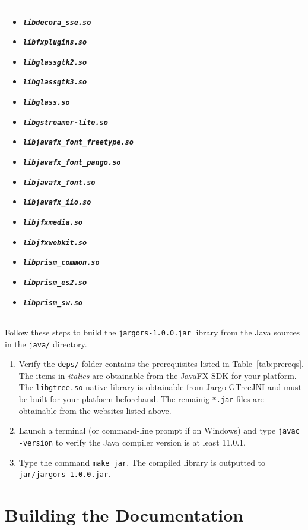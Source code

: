 \begin{table}
\begin{tabular}{|p{}|}
\begin{itemize}
\item \textit{\texttt{libdecora\_sse.so}}
\item \textit{\texttt{libfxplugins.so}}
\item \textit{\texttt{libglassgtk2.so}}
\item \textit{\texttt{libglassgtk3.so}}
\item \textit{\texttt{libglass.so}}
\item \textit{\texttt{libgstreamer-lite.so}}
\item \textit{\texttt{libjavafx\_font\_freetype.so}}
\item \textit{\texttt{libjavafx\_font\_pango.so}}
\item \textit{\texttt{libjavafx\_font.so}}
\item \textit{\texttt{libjavafx\_iio.so}}
\item \textit{\texttt{libjfxmedia.so}}
\item \textit{\texttt{libjfxwebkit.so}}
\item \textit{\texttt{libprism\_common.so}}
\item \textit{\texttt{libprism\_es2.so}}
\item \textit{\texttt{libprism\_sw.so}}
\end{itemize}\\
\hline
\end{tabular}
\end{table}

Follow these steps to build the \texttt{jargors-1.0.0.jar} library from the
Java sources in the \texttt{java/} directory.
\begin{enumerate}
\item Verify the \texttt{deps/} folder contains the prerequisites listed in
Table~\ref{tab:prereqs}.  The items in \textit{italics} are obtainable from the
JavaFX SDK for your platform. The \texttt{libgtree.so} native library is
obtainable from Jargo GTreeJNI and must be built for your platform beforehand.
The remainig \texttt{*.jar} files are obtainable from the websites listed
above.
\item Launch a terminal (or command-line prompt if on Windows) and type
\texttt{javac -version} to verify the Java compiler version is at least 11.0.1.
\item Type the command \texttt{make jar}. The compiled library is outputted
to \texttt{jar/jargors-1.0.0.jar}.
\end{enumerate}

\section{Building the Documentation}

